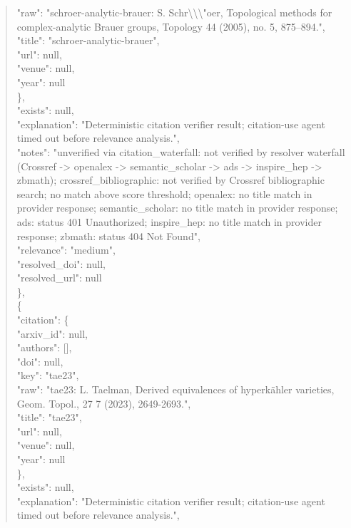 \documentclass[11pt]{article}
\begin{document}
\begin{quote}
        "raw": "schroer-analytic-brauer: S. Schr\textbackslash{}\textbackslash{}\textbackslash{}"oer, Topological methods for complex-analytic Brauer groups, Topology 44 (2005), no. 5, 875--894.",\\
        "title": "schroer-analytic-brauer",\\
        "url": null,\\
        "venue": null,\\
        "year": null\\
      \},\\
      "exists": null,\\
      "explanation": "Deterministic citation verifier result; citation-use agent timed out before relevance analysis.",\\
      "notes": "unverified via citation\_waterfall: not verified by resolver waterfall (Crossref -> openalex -> semantic\_scholar -> ads -> inspire\_hep -> zbmath); crossref\_bibliographic: not verified by Crossref bibliographic search; no match above score threshold; openalex: no title match in provider response; semantic\_scholar: no title match in provider response; ads: status 401 Unauthorized; inspire\_hep: no title match in provider response; zbmath: status 404 Not Found",\\
      "relevance": "medium",\\
      "resolved\_doi": null,\\
      "resolved\_url": null\\
    \},\\
    \{\\
      "citation": \{\\
        "arxiv\_id": null,\\
        "authors": [],\\
        "doi": null,\\
        "key": "tae23",\\
        "raw": "tae23: L. Taelman, Derived equivalences of hyperkähler varieties, Geom. Topol., 27 7 (2023), 2649-2693.",\\
        "title": "tae23",\\
        "url": null,\\
        "venue": null,\\
        "year": null\\
      \},\\
      "exists": null,\\
      "explanation": "Deterministic citation verifier result; citation-use agent timed out before relevance analysis.",\\

\end{quote}
\end{document}
